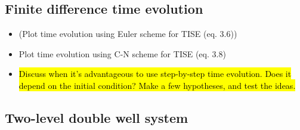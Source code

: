 \subsection*{Finite difference time evolution}
\begin{itemize}
    \item (Plot time evolution using Euler scheme for TISE (eq. 3.6))
    \item Plot time evolution using C-N scheme for TISE (eq. 3.8)
    \item \hl{Discuss when it's advantageous to use step-by-step time evolution. Does it depend on the initial condition? Make a few hypotheses, and test the ideas.}
\end{itemize}

\subsection*{Two-level double well system}

